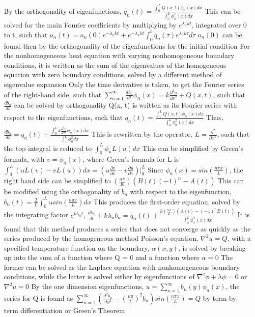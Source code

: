 \documentclass[11 pt, twoside]{article}
\newenvironment{outline*}
{
	\begin{outline}[enumerate]
	}
	{\end{outline}
}
\newcommand\pd[2]{\frac{\partial #1}{\partial #2}}
\begin{document}
\begin{outline*}
		\3 By the orthogonality of eigenfunctions, $q_n(t) = \frac{\int^L_0 Q(x, t) \phi_n(x)dx}{\int_0^L \phi^2_n(x)dx}$
		\3 This can be solved for the main Fourier coefficients by multiplying by $e^{\lambda_n kt}$, integrated over 0 to t, such 	that $a_n(t) = a_n(0)e^{-\lambda_n kt} + e^{-\lambda_n kt}\int^t_0 q_n(\tau)e^{\lambda_n k \tau}d\tau$
			\4 $a_n(0)$ can be found then by the orthogonality of the eigenfunctions for the initial condition
\1 For the nonhomogeneous heat equation with varying nonhomogeneous boundary conditions, it is written as the sum of the eigenvalues of the homogeneous equation with zero boundary conditions, solved by a different method of eigenvalue expansion
	\2 Only the time derivative is taken, to get the Fourier series of the right-hand side, such that $\sum_{n = 1}^{\infty} \frac{db_n}{dt}\phi_n(x) = k\pd{^2u}{x^2} + Q(x, t)$, such that $\frac{db_n}{dt}$ can be solved by orthogonality
	\2 Q(x, t) is written as its Fourier series with respect to the eigenfunctions, such that $q_n(t) = \frac{\int^L_0 Q(x, t) \phi_n(x)dx}{\int_0^L \phi^2_n(x)dx}$
		\3 Thus, $\frac{db_n}{dt} = q_n(t) + \frac{\int^L_0 k\pd{^2u}{x^2}\phi_n(x)dx}{\int^L_0 \phi_n^2 dx}$
		\3 This is rewritten by the operator, $L = \pd{^2}{x^2}$, such that the top integral is reduced to $\int^L_0 \phi_n L(u)dx$
	\2 This can be simplified by Green's formula, with $v = \phi_n(x)$, where Green's formula for L is $\int^L_0 (uL(v) - vL(u))dx = (u\pd{v}{x} - v\pd{u}{x})|^L_0$
		\3 Since $\phi_n(x) = sin(\frac{n\pi x}{L})$, the right hand side can be simplified to $(\frac{n\pi}{K})(B(t)(-1)^n - A(t))$
		\3 This can be modified using the orthogonality of $b_n$ with respect to the eigenfunction, $b_n(t) = \frac{2}{L} \int^L_0 u sin(\frac{n\pi x}{L})dx$
	\2 This produces the first-order equation, solved by the integrating factor $e^{k\lambda_n t}$, $\frac{db_n}{dt} + k\lambda_n b_n = q_n(t) + \frac{k(\frac{n\pi}{L})(A(t) - (-1)^nB(t))}{\int^L_0 \phi_n^2(x)dx}$
	\2 It is found that this method produces a series that does not converge as quickly as the series produced by the homogeneous method
\1 Poisson's equation, $\nabla^2 u = Q$, with a specified temperature function on the boundary, $\alpha(x, y)$, is solved by breaking up into the sum of a function where Q = 0 and a function where $\alpha = 0$
	\2 The former can be solved as the Laplace equation with nonhomogeneous boundary conditions, while the latter is solved either by eigenfunctions of $\nabla^2 \phi + \lambda \phi = 0$ or $\nabla^2 u = 0$
	\2 By the one dimension eigenfunctions, $u = \sum_{n = 1}^{\infty} b_n(y) \phi_n(x)$, the series for Q is found as $\sum_{n = 1}^{\infty} (\frac{d^2b_n}{dy^2} - (\frac{n\pi}{L})^2b_n)sin(\frac{n\pi x}{L}) = Q$ by term-by-term differentiation or Green's Theorem

\end{outline*}
\end{document}
